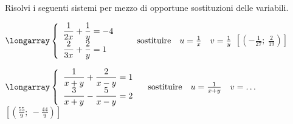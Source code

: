 \begin{esercizio}[\Ast]
 \label{ese:22.64}
 Risolvi i seguenti sistemi per mezzo di opportune sostituzioni delle variabili.

\begin{enumeratea}
\item \(\longarray\left\{\begin{array}{l}
\dfrac{1}{2x}+\dfrac{1}{y}=-4\\\dfrac{2}{3x}+\dfrac{2}{y}=1
\end{array}\right. 
\qquad \text{sostituire} \quad u=\frac{1}{x} \quad v=\frac{1}{y}\)
\hfill \(\left[\left(-{\frac{1}{27}};~\frac{2}{19}\right)\right]\)


\item \(\longarray\left\{\begin{array}{l}
\dfrac{1}{x+y}+\dfrac{2}{x-y}=1\\\dfrac{3}{x+y}-\dfrac{5}{x-y}=2
\end{array}\right. 
\quad \text{sostituire} \quad u=\frac{1}{x+y} \quad v=\ldots\)
\hfill \(\left[\left(\frac{55}{9};~-\frac{44}{9}\right)\right]\)

\end{enumeratea}
\end{esercizio}

